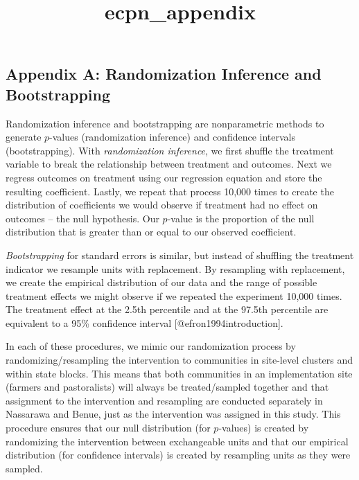\documentclass[
]{article}
\title{ecpn\_appendix}
\author{}
\date{\vspace{-2.5em}}
\begin{document}
\maketitle

\hypertarget{appendix-a-randomization-inference-and-bootstrapping}{%
\subsection{Appendix A: Randomization Inference and
Bootstrapping}\label{appendix-a-randomization-inference-and-bootstrapping}}

Randomization inference and bootstrapping are nonparametric methods to
generate \(p\)-values (randomization inference) and confidence intervals
(bootstrapping). With \emph{randomization inference}, we first shuffle
the treatment variable to break the relationship between treatment and
outcomes. Next we regress outcomes on treatment using our regression
equation and store the resulting coefficient. Lastly, we repeat that
process 10,000 times to create the distribution of coefficients we would
observe if treatment had no effect on outcomes -- the null hypothesis.
Our \(p\)-value is the proportion of the null distribution that is
greater than or equal to our observed coefficient.

\emph{Bootstrapping} for standard errors is similar, but instead of
shuffling the treatment indicator we resample units with replacement. By
resampling with replacement, we create the empirical distribution of our
data and the range of possible treatment effects we might observe if we
repeated the experiment 10,000 times. The treatment effect at the 2.5th
percentile and at the 97.5th percentile are equivalent to a 95\%
confidence interval {[}@efron1994introduction{]}.

In each of these procedures, we mimic our randomization process by
randomizing/resampling the intervention to communities in site-level
clusters and within state blocks. This means that both communities in an
implementation site (farmers and pastoralists) will always be
treated/sampled together and that assignment to the intervention and
resampling are conducted separately in Nassarawa and Benue, just as the
intervention was assigned in this study. This procedure ensures that our
null distribution (for \(p\)-values) is created by randomizing the
intervention between exchangeable units and that our empirical
distribution (for confidence intervals) is created by resampling units
as they were sampled.
\end{document}
